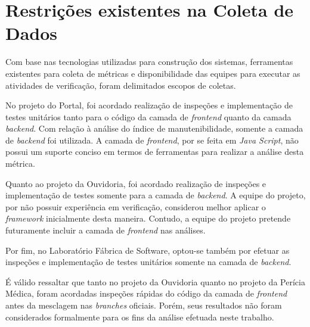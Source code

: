 \section{Restrições existentes na Coleta de Dados}

Com base nas tecnologias utilizadas para construção dos sistemas, ferramentas existentes para coleta de métricas e disponibilidade das equipes para executar as atividades de verificação, foram delimitados escopos de coletas.

No projeto do Portal, foi acordado realização de inspeções e implementação de testes unitários tanto para o código da camada de \textit{frontend} quanto da camada \textit{backend}. Com relação à análise do índice de manutenibilidade, somente a camada de \textit{backend} foi utilizada. A camada de \textit{frontend}, por se feita em \textit{Java Script}, não possui um suporte conciso em termos de ferramentas para realizar a análise desta métrica.

Quanto ao projeto da Ouvidoria, foi acordado realização de inspeções e implementação de testes somente para a camada de \textit{backend}. A equipe do projeto, por não possuir experiência em verificação, considerou melhor aplicar o \textit{framework} inicialmente desta maneira. Contudo, a equipe do projeto pretende futuramente incluir a camada de \textit{frontend} nas análises.

Por fim, no Laboratório Fábrica de Software, optou-se também por efetuar as inspeções e implementação de testes unitários somente na camada de \textit{backend}.

É válido ressaltar que tanto no projeto da Ouvidoria quanto no projeto da Perícia Médica, foram acordadas inspeções rápidas do código da camada de \textit{frontend} antes da mesclagem nas \textit{branches} oficiais. Porém, seus resultados não foram considerados formalmente para os fins da análise efetuada neste trabalho.

\clearpage